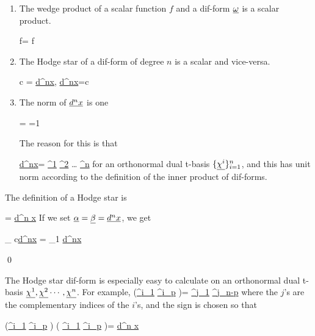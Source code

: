 \begin{enumerate}
\item
The wedge product of a 
scalar function $f$ and a dif-form
$\ul{\omega}$ is a scalar product.

\beq
f\wedge \ul{\omega}= f\ul{\omega}
\eeq

\item 
The Hodge star
of a dif-form of degree $n$
is a scalar  and vice-versa.

\beq
\star c = \ul{d^nx},
\quad \star \ul{d^nx}=c
\eeq


\item The norm of $\ul{d^nx}$ is one

\beq
{}=
=1
\eeq

The reason for this is that

\beq
\ul{d^nx}=
\ul{\chi^1}\wedge
\ul{\chi^2} \wedge
\ldots
\ul{\chi^n}
\eeq
for an orthonormal
dual t-basis $\{\ul{\chi^i}\}_{i=1}^n$,
and this has unit norm
according to
the definition
of the inner product 
of dif-forms.
\end{enumerate}

The definition
of a Hodge star
is

\beq
\ul{\alp}
\wedge \star \ul{\beta}=
\av{\ul{\alp}, \ul{\beta}}
\ul{d^n x}
\eeq
If we set $\ul{\alp}=\ul{\beta}=\ul{d^nx}$, we get

\beq
{}_
{c\ul{d^nx}}
=
_{1}
\ul{d^nx}
\eeq


\qed



The Hodge star dif-form is especially easy to calculate on an orthonormal dual t-basis
$\ul{\chi^1}, \ul{\chi^2}
\cdots, \ul{\chi^n}$.
For example,
\beq
\star(\ul{\chi^{i_1}}
\wedge\cdots\wedge
\ul{\chi^{i_p}}
)=
\pm
\ul{\chi^{j_1}}
\wedge\cdots\wedge
\ul{\chi^{j_{n-p}}}
\eeq
where the $j$'s are the complementary indices of the $i$'s, and the sign is chosen so that

\beq
(\ul{\chi^{i_1}}
\wedge\cdots\wedge
\ul{\chi^{i_p}}
)
\wedge
\star(
\ul{\chi^{i_1}}
\wedge\cdots\wedge
\ul{\chi^{i_p}}
)=
\ul{d^n x}
\eeq

